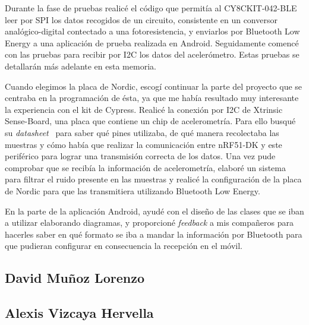 Durante la fase de pruebas realicé el código que permitía al CY8CKIT-042-BLE leer por SPI los datos recogidos de un circuito, consistente en un conversor analógico-digital contectado a una fotoresistencia, y enviarlos por Bluetooth Low Energy a una aplicación de prueba realizada en Android. Seguidamente comencé con las pruebas para recibir por I2C los datos del acelerómetro. Estas pruebas se detallarán más adelante en esta memoria.

Cuando elegimos la placa de Nordic, escogí continuar la parte del proyecto que se centraba en la programación de ésta, ya que me había resultado muy interesante la experiencia con el kit de Cypress. Realicé la conexión por I2C de Xtrinsic Sense-Board, una placa que contiene un chip de acelerometría. Para ello busqué su \textit{datasheet}~\cite{DatasheetAcc} para saber qué pines utilizaba, de qué manera recolectaba las muestras y cómo había que realizar la comunicación entre nRF51-DK y este periférico para lograr una transmisión correcta de los datos. Una vez pude comprobar que se recibía la información de acelerometría, elaboré un sistema para filtrar el ruido presente en las muestras y realicé la configuración de la placa de Nordic para que las transmitiera utilizando Bluetooth Low Energy.

En la parte de la aplicación Android, ayudé con el diseño de las clases que se iban a utilizar elaborando diagramas, y proporcioné \textit{feedback} a mis compañeros para hacerles saber en qué formato se iba a mandar la información por Bluetooth para que pudieran configurar en consecuencia la recepción en el móvil. 

\subsection{David Muñoz Lorenzo}

\subsection{Alexis Vizcaya Hervella}

%
%
%


